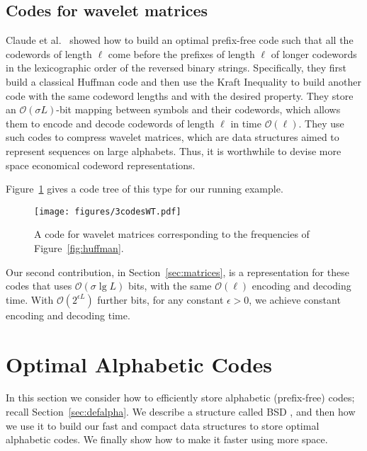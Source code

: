 \documentclass[preprint,12pt]{elsarticle}
\newcommand{\Oh}[1]{\ensuremath{\mathcal{O}\!\left({#1}\right)}}
\renewcommand{\log}{\lg}
\begin{document}
\subsection{Codes for wavelet matrices}
\label{sec:defwm}

Claude et al.\ \cite{CNO15} showed how to build an optimal prefix-free code 
such that all the codewords of length $\ell$ come before the prefixes of
length $\ell$ of longer codewords in the lexicographic order of the reversed
binary strings.
Specifically, they first build a classical Huffman code and then use the 
Kraft Inequality to build another code with the same codeword lengths and 
with the desired property. They store an $\Oh{\sigma L}$-bit mapping between 
symbols and their codewords, which allows them to encode and decode 
codewords of length $\ell$ in time $\Oh{\ell}$. They use such codes to 
compress wavelet matrices, which are data structures aimed to represent
sequences on large alphabets. Thus, it is worthwhile to devise more space 
economical codeword representations. 

Figure~\ref{fig:wmm} gives a code tree of this type for our running example.

\begin{figure}[t]
\begin{center}
\texttt{[image: figures/3codesWT.pdf]}
\end{center}
\vspace*{-5mm}
\caption{A code for wavelet matrices corresponding to the frequencies of 
Figure~\ref{fig:huffman}.}
\label{fig:wmm}
\end{figure}

Our second contribution, in Section~\ref{sec:matrices}, is a representation
for these codes that uses $\Oh{\sigma\log L}$ bits, with the same $\Oh{\ell}$ 
encoding and decoding time. With $\Oh{2^{\epsilon L}}$ further bits, for any 
constant $\epsilon>0$, we achieve constant encoding and decoding time.

\section{Optimal Alphabetic Codes}
\label{sec:alphabetic}



In this section we consider how to efficiently store alphabetic (prefix-free)
codes; recall Section~\ref{sec:defalpha}.
We describe a structure called BSD \cite{GHSV07}, and then how 
we use it to build our fast and compact data structures to store optimal 
alphabetic codes. We finally show how to make it faster using more space.
\end{document}
